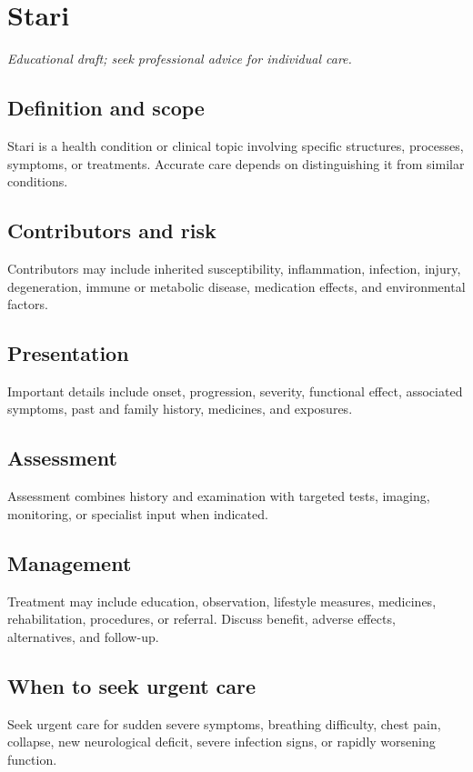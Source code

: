 \chapter{Stari}
\medskip
\noindent\textit{Educational draft; seek professional advice for individual care.}

\section*{Definition and scope}
Stari is a health condition or clinical topic involving specific structures, processes, symptoms, or treatments. Accurate care depends on distinguishing it from similar conditions.

\section*{Contributors and risk}
Contributors may include inherited susceptibility, inflammation, infection, injury, degeneration, immune or metabolic disease, medication effects, and environmental factors.

\section*{Presentation}
Important details include onset, progression, severity, functional effect, associated symptoms, past and family history, medicines, and exposures.

\section*{Assessment}
Assessment combines history and examination with targeted tests, imaging, monitoring, or specialist input when indicated.

\section*{Management}
Treatment may include education, observation, lifestyle measures, medicines, rehabilitation, procedures, or referral. Discuss benefit, adverse effects, alternatives, and follow-up.

\section*{When to seek urgent care}
Seek urgent care for sudden severe symptoms, breathing difficulty, chest pain, collapse, new neurological deficit, severe infection signs, or rapidly worsening function.

